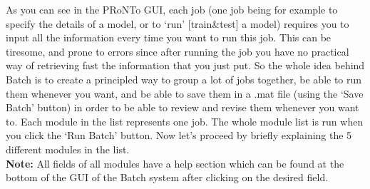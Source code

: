 As you can see in the PRoNTo GUI, each job (one job being for example to specify the details of a model, or to `run' [train\&test] a model) requires you to input all the information every time you want to run this job. This can be tiresome, and prone to errors since after running the job you have no practical way of retrieving fast the information that you just put. So the whole idea behind Batch is to create a principled way to group a lot of jobs together, be able to run them whenever you want, and be able to save them in a .mat file (using the `Save Batch' button) in order to be able to review and revise them whenever you want to. Each module in the list represents one job. The whole module list is run when you click the `Run Batch' button. Now let's proceed by briefly explaining the 5 different modules in the list.
\\


\noindent \textbf{Note:} All fields of all modules have a help section which can be found at the bottom of the GUI of the Batch system after clicking on the desired field.


